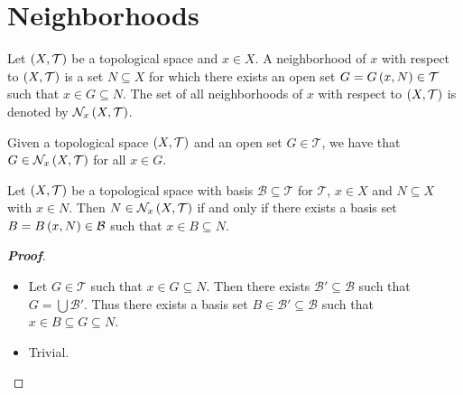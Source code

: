 \section{Neighborhoods}

\begin{definition}
  Let $\left(X,\mathcal{T}\right)$ be a topological space and $x\in X$. A neighborhood of $x$ with respect to $\left(X,\mathcal{T}\right)$ is a set $N\subseteq X$ for which there exists an open set $G=G\left(x,N\right)\in\mathcal{T}$ such that $x\in G\subseteq N$. The set of all neighborhoods of $x$ with respect to $\left(X,\mathcal{T}\right)$ is denoted by $\mathcal{N}_x\left(X,\mathcal{T}\right)$.
\end{definition}

\begin{remark}
  Given a topological space $\left(X,\mathcal{T}\right)$ and an open set $G\in\mathcal{T}$, we have that $G\in\mathcal{N}_x\left(X,\mathcal{T}\right)$ for all $x\in G$.
\end{remark}

\begin{proposition}
  Let $\left(X,\mathcal{T}\right)$ be a topological space with basis $\mathcal{B}\subseteq\mathcal{T}$ for $\mathcal{T}$, $x\in X$ and $N\subseteq X$ with $x\in N$. Then $N\in\mathcal{N}_x\left(X,\mathcal{T}\right)$ if and only if there exists a basis set $B=B\left(x,N\right)\in\mathcal{B}$ such that $x\in B\subseteq N$.
  \begin{proof}[\rm\textbf{Proof}]
    \hfill
    \begin{itemize}
      \item[\boxed{\Rightarrow}] Let $G\in\mathcal{T}$ such that $x\in G\subseteq N$. Then there exists $\mathcal{B}'\subseteq\mathcal{B}$ such that $G=\bigcup{\mathcal{B}'}$. Thus there exists a basis set $B\in\mathcal{B}'\subseteq\mathcal{B}$ such that $x\in B\subseteq G\subseteq N$.
      \item[\boxed{\Leftarrow}] Trivial.
    \end{itemize}
  \end{proof}
\end{proposition}

